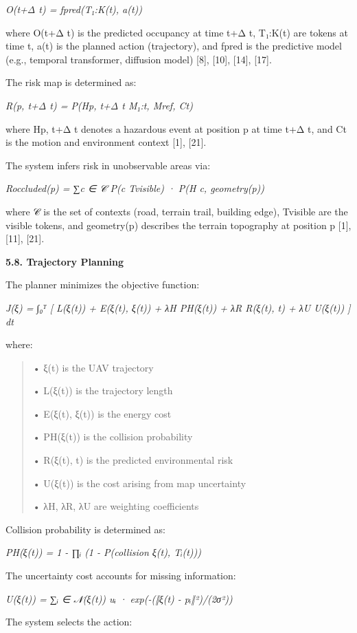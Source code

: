 \documentclass[
]{article}
\begin{document}
\emph{O(t+Δ t) = fpred(T₁:K(t), a(t))}

where O(t+Δ t) is the predicted occupancy at time t+Δ t, T₁:K(t) are
tokens at time t, a(t) is the planned action (trajectory), and fpred is
the predictive model (e.g., temporal transformer, diffusion model)
{[}8{]}, {[}10{]}, {[}14{]}, {[}17{]}.

The risk map is determined as:

\emph{R(p, t+Δ t) = P(Hp, t+Δ t \textbar{} M₁:t, Mref, Ct)}

where Hp, t+Δ t denotes a hazardous event at position p at time t+Δ t,
and Ct is the motion and environment context {[}1{]}, {[}21{]}.

The system infers risk in unobservable areas via:

\emph{Roccluded(p) = ∑c ∈ 𝒞 P(c \textbar{} Tvisible) · P(H \textbar{} c,
geometry(p))}

where 𝒞 is the set of contexts (road, terrain trail, building edge),
Tvisible are the visible tokens, and geometry(p) describes the terrain
topography at position p {[}1{]}, {[}11{]}, {[}21{]}.

\textbf{5.8. Trajectory Planning}

The planner minimizes the objective function:

\emph{J(ξ) = ∫₀ᵀ {[} L(ξ(t)) + E(ξ(t), ξ(t)) + λH PH(ξ(t)) + λR R(ξ(t),
t) + λU U(ξ(t)) {]} dt}

where:

\begin{quote}
• ξ(t) is the UAV trajectory

• L(ξ(t)) is the trajectory length

• E(ξ(t), ξ(t)) is the energy cost

• PH(ξ(t)) is the collision probability

• R(ξ(t), t) is the predicted environmental risk

• U(ξ(t)) is the cost arising from map uncertainty

• λH, λR, λU are weighting coefficients
\end{quote}

Collision probability is determined as:

\emph{PH(ξ(t)) = 1 - ∏ᵢ (1 - P(collision \textbar{} ξ(t), Tᵢ(t)))}

The uncertainty cost accounts for missing information:

\emph{U(ξ(t)) = ∑ᵢ ∈ 𝒩(ξ(t)) uᵢ · exp(-(‖ξ(t) - pᵢ‖²)/(2σ²))}

The system selects the action:
\end{document}
